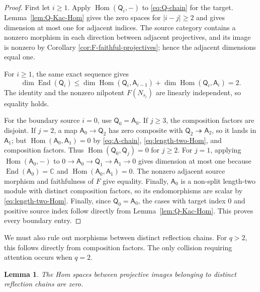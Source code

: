\documentclass[12pt,leqno]{amsart}
\numberwithin{equation}{section}
\newtheorem{lem}[thm]{Lemma}
\newcommand{\End}{\operatorname{End}}
\newcommand{\Hom}{\operatorname{Hom}}
\def\C{\mathbb{C}}
\begin{document}
\begin{proof}
First let $i\geq1$.  Apply $\Hom(\mathsf Q_i,-)$ to
\eqref{eq:Q-chain} for the target.  Lemma~\ref{lem:Q-Kac-Hom} gives the zero
spaces for $|i-j|\geq2$ and gives dimension at most one for adjacent indices.
The source category contains a nonzero morphism in each direction between
adjacent projectives, and its image is nonzero by Corollary
\ref{cor:F-faithful-projectives}; hence the adjacent dimensions equal one.

For $i\geq1$, the same exact sequence gives
\[
 \dim\End(\mathsf Q_i)\leq
 \dim\Hom(\mathsf Q_i,\mathsf A_{i-1})+
 \dim\Hom(\mathsf Q_i,\mathsf A_i)=2.
\]
The identity and the nonzero nilpotent $F(N_{s_i})$ are linearly
independent, so equality holds.

For the boundary source $i=0$, use $\mathsf Q_0=\mathsf A_0$.  If $j\geq3$,
the composition factors are disjoint.  If $j=2$, a map
$\mathsf A_0\to\mathsf Q_2$ has zero composite with
$\mathsf Q_2\twoheadrightarrow\mathsf A_2$, so it lands in
$\mathsf A_1$; but $\Hom(\mathsf A_0,\mathsf A_1)=0$ by
\eqref{eq:A-chain}, \eqref{eq:length-two-Hom}, and composition factors.
Thus $\Hom(\mathsf Q_0,\mathsf Q_j)=0$ for $j\geq2$.  For $j=1$, applying
$\Hom(\mathsf A_0,-)$ to
$0\to\mathsf A_0\to\mathsf Q_1\to\mathsf A_1\to0$ gives dimension at most
one because $\End(\mathsf A_0)=\C$ and
$\Hom(\mathsf A_0,\mathsf A_1)=0$.  The nonzero adjacent source morphism and
faithfulness of $F$ give equality.  Finally, $\mathsf A_0$ is a non-split
length-two module with distinct composition factors, so its endomorphisms
are scalar by \eqref{eq:length-two-Hom}.  Finally, since
$\mathsf Q_0=\mathsf A_0$, the cases with target index $0$ and positive
source index follow directly from Lemma~\ref{lem:Q-Kac-Hom}.
This proves every boundary entry.
\end{proof}

We must also rule out morphisms between distinct reflection chains.  For
$q>2$, this follows directly from composition factors.  The only collision
requiring attention occurs when $q=2$.

\begin{lem}\label{lem:cross-chain}
The Hom spaces between projective images belonging to distinct reflection
chains are zero.
\end{lem}
\end{document}
